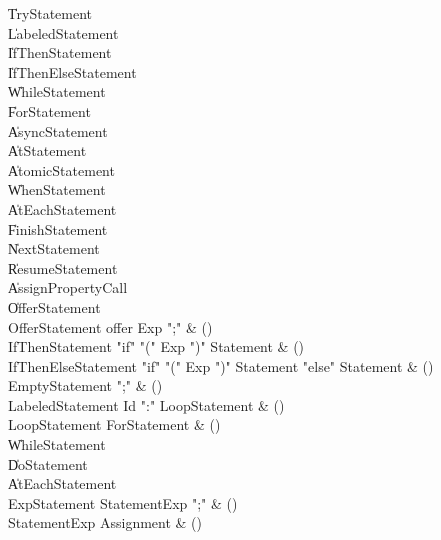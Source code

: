\begin{bbgrammar}

    \| TryStatement\\
    \| LabeledStatement\\
    \| IfThenStatement\\
    \| IfThenElseStatement\\
    \| WhileStatement\\
    \| ForStatement\\
    \| AsyncStatement\\
    \| AtStatement\\
    \| AtomicStatement\\
    \| WhenStatement\\
    \| AtEachStatement\\
    \| FinishStatement\\
    \| NextStatement\\
    \| ResumeStatement\\
    \| AssignPropertyCall\\
    \| OfferStatement\\
 OfferStatement  \label{prod:OfferStatement}  \: offer Exp \xcd";" & ()\\
 IfThenStatement  \label{prod:IfThenStatement}  \: \xcd"if" \xcd"(" Exp \xcd")" Statement & ()\\
 IfThenElseStatement  \label{prod:IfThenElseStatement}  \: \xcd"if" \xcd"(" Exp \xcd")" Statement  \xcd"else" Statement  & ()\\
 EmptyStatement  \label{prod:EmptyStatement}  \: \xcd";" & ()\\
 LabeledStatement  \label{prod:LabeledStatement}  \: Id \xcd":" LoopStatement & ()\\
 LoopStatement  \label{prod:LoopStatement}  \: ForStatement & ()\\
    \| WhileStatement\\
    \| DoStatement\\
    \| AtEachStatement\\
 ExpStatement  \label{prod:ExpStatement}  \: StatementExp \xcd";" & ()\\
 StatementExp  \label{prod:StatementExp}  \: Assignment & ()\\

\end{bbgrammar}
